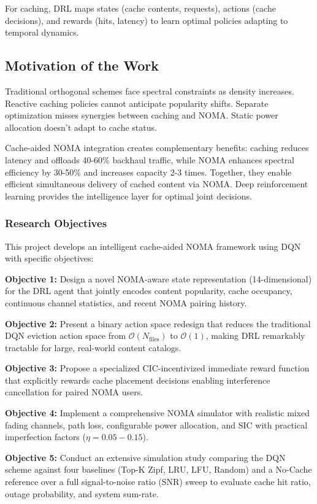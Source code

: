 \documentclass[12pt,a4paper]{article}
\begin{document}
For caching, DRL maps states (cache contents, requests), actions (cache decisions), and rewards (hits, latency) to learn optimal policies adapting to temporal dynamics.

\subsection{Motivation of the Work}

Traditional orthogonal schemes face spectral constraints as density increases. Reactive caching policies cannot anticipate popularity shifts. Separate optimization misses synergies between caching and NOMA. Static power allocation doesn't adapt to cache status.

Cache-aided NOMA integration creates complementary benefits: caching reduces latency and offloads 40-60\% backhaul traffic, while NOMA enhances spectral efficiency by 30-50\% and increases capacity 2-3 times. Together, they enable efficient simultaneous delivery of cached content via NOMA. Deep reinforcement learning provides the intelligence layer for optimal joint decisions.

\subsubsection{Research Objectives}

This project develops an intelligent cache-aided NOMA framework using DQN with specific objectives:

\textbf{Objective 1:} Design a novel NOMA-aware state representation (14-dimensional) for the DRL agent that jointly encodes content popularity, cache occupancy, continuous channel statistics, and recent NOMA pairing history.

\textbf{Objective 2:} Present a binary action space redesign that reduces the traditional DQN eviction action space from $\mathcal{O}(N_{\text{files}})$ to $\mathcal{O}(1)$, making DRL remarkably tractable for large, real-world content catalogs.

\textbf{Objective 3:} Propose a specialized CIC-incentivized immediate reward function that explicitly rewards cache placement decisions enabling interference cancellation for paired NOMA users.

\textbf{Objective 4:} Implement a comprehensive NOMA simulator with realistic mixed fading channels, path loss, configurable power allocation, and SIC with practical imperfection factors ($\eta = 0.05-0.15$).

\textbf{Objective 5:} Conduct an extensive simulation study comparing the DQN scheme against four baselines (Top-K Zipf, LRU, LFU, Random) and a No-Cache reference over a full signal-to-noise ratio (SNR) sweep to evaluate cache hit ratio, outage probability, and system sum-rate.
\end{document}
